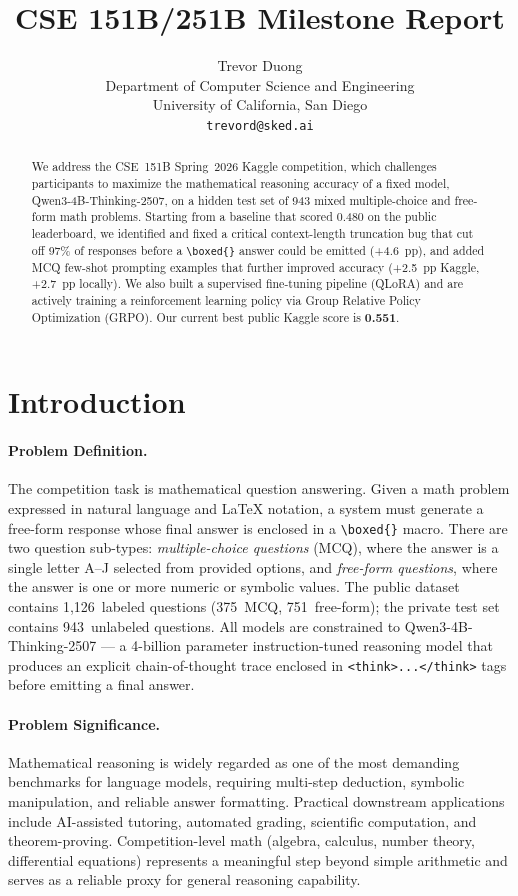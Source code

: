 \documentclass{article}
\title{
CSE 151B/251B Milestone Report
}
\author{%
  Trevor Duong \\
  Department of Computer Science and Engineering \\
  University of California, San Diego \\
  \texttt{trevord@sked.ai} \\
}
\begin{document}
\maketitle


\begin{abstract}
We address the CSE~151B Spring~2026 Kaggle competition, which challenges participants to maximize the mathematical reasoning accuracy of a fixed model, Qwen3-4B-Thinking-2507, on a hidden test set of 943 mixed multiple-choice and free-form math problems. Starting from a baseline that scored 0.480 on the public leaderboard, we identified and fixed a critical context-length truncation bug that cut off 97\% of responses before a \verb|\boxed{}| answer could be emitted (+4.6~pp), and added MCQ few-shot prompting examples that further improved accuracy (+2.5~pp Kaggle, +2.7~pp locally). We also built a supervised fine-tuning pipeline (QLoRA) and are actively training a reinforcement learning policy via Group Relative Policy Optimization (GRPO). Our current best public Kaggle score is \textbf{0.551}.
\end{abstract}


\section{Introduction}
\label{sec:intro}

\paragraph{Problem Definition.}
The competition task is mathematical question answering. Given a math problem expressed in natural language and LaTeX notation, a system must generate a free-form response whose final answer is enclosed in a \verb|\boxed{}| macro. There are two question sub-types: \emph{multiple-choice questions} (MCQ), where the answer is a single letter A--J selected from provided options, and \emph{free-form questions}, where the answer is one or more numeric or symbolic values. The public dataset contains 1,126~labeled questions (375~MCQ, 751~free-form); the private test set contains 943~unlabeled questions. All models are constrained to Qwen3-4B-Thinking-2507 --- a 4-billion parameter instruction-tuned reasoning model that produces an explicit chain-of-thought trace enclosed in \verb|<think>...</think>| tags before emitting a final answer.

\paragraph{Problem Significance.}
Mathematical reasoning is widely regarded as one of the most demanding benchmarks for language models, requiring multi-step deduction, symbolic manipulation, and reliable answer formatting. Practical downstream applications include AI-assisted tutoring, automated grading, scientific computation, and theorem-proving. Competition-level math (algebra, calculus, number theory, differential equations) represents a meaningful step beyond simple arithmetic and serves as a reliable proxy for general reasoning capability.
\end{document}
